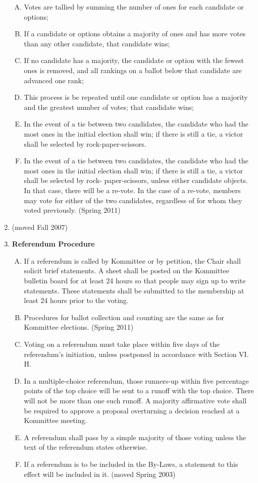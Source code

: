 \documentclass[12pt]{article}
\begin{document}
\begin{enumerate}[1.]
\begin{enumerate}[A.]
\item Votes are tallied by summing the number of ones for each candidate or options; 
\item If a candidate or options obtains a majority of ones and has more votes than any other candidate, that candidate wins; 
\item If no candidate has a majority, the candidate or option with the fewest ones is removed, and all rankings on a ballot below that candidate are advanced one rank; 
\item This process is be repeated until one candidate or option has a majority and the greatest number of votes; that candidate wins; 
\item In the event of a tie between two candidates, the candidate who had the most ones in the initial election shall win; if there is still a tie, a victor shall be selected by rock-paper-scissors. 
\item In the event of a tie between two candidates, the candidate who had the most ones in the initial election shall win; if there is still a tie, a victor shall be selected by rock- paper-scissors, unless either candidate objects. In that case, there will be a re-vote. In the case of a re-vote, members may vote for either of the two candidates, regardless of for whom they voted previously. (Spring 2011)
\end{enumerate}
\item (moved Fall 2007)
\item \textbf{Referendum Procedure}
\begin{enumerate}[A.]
\item If a referendum is called by Kommittee or by petition, the Chair shall solicit brief statements. A sheet shall be posted on the Kommittee bulletin board for at least 24 hours so that people may sign up to write statements. These statements shall be submitted to the membership at least 24 hours prior to the voting.
\item Procedures for ballot collection and counting are the same as for Kommittee elections. (Spring 2011) 
\item Voting on a referendum must take place within five days of the referendum's initiation, unless postponed in accordance with Section VI. H. 
\item In a multiple-choice referendum, those runners-up within five percentage points of the top choice will be sent to a runoff with the top choice. There will not be more than one such runoff. A majority affirmative vote shall be required to approve a proposal overturning a decision reached at a Kommittee meeting. 
\item A referendum shall pass by a simple majority of those voting unless the text of the referendum states otherwise.
\item If a referendum is to be included in the By-Laws, a statement to this effect will be included in it. (moved Spring 2003)
\end{enumerate}
\end{enumerate}
\end{document}
